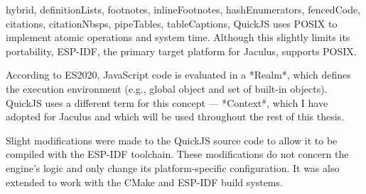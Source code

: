 \begin{markdown*}{%
  hybrid,
  definitionLists,
  footnotes,
  inlineFootnotes,
  hashEnumerators,
  fencedCode,
  citations,
  citationNbsps,
  pipeTables,
  tableCaptions,
}
QuickJS uses POSIX to implement atomic operations and system time. Although this slightly limits its portability, ESP-IDF, the primary target platform for Jaculus, supports POSIX.

According to ES2020, JavaScript code is evaluated in a *Realm*, which defines the execution environment (e.g., global object and set of built-in objects). QuickJS uses a different term for this concept --- *Context*, which I have adopted for Jaculus and which will be used throughout the rest of this thesis.

Slight modifications were made to the QuickJS source code to allow it to be compiled with the ESP-IDF toolchain. These modifications do not concern the engine's logic and only change its platform-specific configuration. It was also extended to work with the CMake and ESP-IDF build systems.


\end{markdown*}
